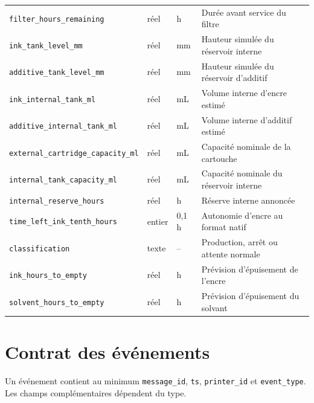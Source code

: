 {\begin{longtable}{p{}p{}p{}p{}}
\nolinkurl{filter_hours_remaining} & réel & h & Durée avant service du filtre \\
\texttt{ink\_tank\_level\_mm} & réel & mm & Hauteur simulée du réservoir interne \\
\texttt{additive\_tank\_level\_mm} & réel & mm & Hauteur simulée du réservoir d'additif \\
\texttt{ink\_internal\_tank\_ml} & réel & mL & Volume interne d'encre estimé \\
\addlinespace[4pt]
\nolinkurl{additive_internal_tank_ml} & réel & mL & Volume interne d'additif estimé \\
\addlinespace[4pt]
\nolinkurl{external_cartridge_capacity_ml} & réel & mL & Capacité nominale de la cartouche \\
\nolinkurl{internal_tank_capacity_ml} & réel & mL & Capacité nominale du réservoir interne \\
\texttt{internal\_reserve\_hours} & réel & h & Réserve interne annoncée \\
\addlinespace[4pt]
\nolinkurl{time_left_ink_tenth_hours} & entier & 0,1 h & Autonomie d'encre au format natif \\
\addlinespace[4pt]
\texttt{classification} & texte & -- & Production, arrêt ou attente normale \\
\nolinkurl{ink_hours_to_empty} & réel & h & Prévision d'épuisement de l'encre \\
\nolinkurl{solvent_hours_to_empty} & réel & h & Prévision d'épuisement du solvant \\
\bottomrule
\end{longtable}
}

\section{Contrat des événements}

Un événement contient au minimum \texttt{message\_id}, \texttt{ts},
\texttt{printer\_id} et \texttt{event\_type}. Les champs complémentaires
dépendent du type.

